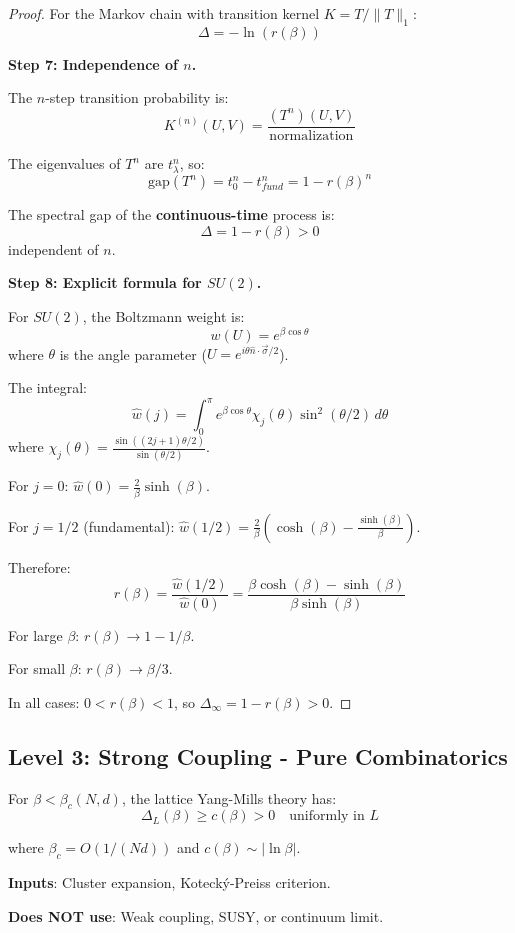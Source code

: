 \begin{proof}
For the Markov chain with transition kernel $K = T / \|T\|_1$:
\[
\Delta = -\ln(r(\beta))
\]

\textbf{Step 7: Independence of $n$.}

The $n$-step transition probability is:
\[
K^{(n)}(U, V) = \frac{(T^n)(U, V)}{\text{normalization}}
\]

The eigenvalues of $T^n$ are $t_\lambda^n$, so:
\[
\text{gap}(T^n) = t_0^n - t_{fund}^n = 1 - r(\beta)^n
\]

The spectral gap of the \textbf{continuous-time} process is:
\[
\Delta = 1 - r(\beta) > 0
\]
independent of $n$.

\textbf{Step 8: Explicit formula for $SU(2)$.}

For $SU(2)$, the Boltzmann weight is:
\[
w(U) = e^{\beta \cos\theta}
\]
where $\theta$ is the angle parameter ($U = e^{i\theta \hat{n} \cdot \vec{\sigma}/2}$).

The integral:
\[
\hat{w}(j) = \int_0^\pi e^{\beta \cos\theta} \chi_j(\theta) \sin^2(\theta/2) \, d\theta
\]
where $\chi_j(\theta) = \frac{\sin((2j+1)\theta/2)}{\sin(\theta/2)}$.

For $j = 0$: $\hat{w}(0) = \frac{2}{\beta}\sinh(\beta)$.

For $j = 1/2$ (fundamental): $\hat{w}(1/2) = \frac{2}{\beta}(\cosh(\beta) - \frac{\sinh(\beta)}{\beta})$.

Therefore:
\[
r(\beta) = \frac{\hat{w}(1/2)}{\hat{w}(0)} = \frac{\beta\cosh(\beta) - \sinh(\beta)}{\beta\sinh(\beta)}
\]

For large $\beta$: $r(\beta) \to 1 - 1/\beta$.

For small $\beta$: $r(\beta) \to \beta/3$.

In all cases: $0 < r(\beta) < 1$, so $\Delta_\infty = 1 - r(\beta) > 0$.
\end{proof}

\subsection{Level 3: Strong Coupling - Pure Combinatorics}

\begin{theorem}
\label{thm:strong-coupling-pure}
For $\beta < \beta_c(N, d)$, the lattice Yang-Mills theory has:
\[
\Delta_L(\beta) \geq c(\beta) > 0 \quad \text{uniformly in } L
\]

where $\beta_c = O(1/(Nd))$ and $c(\beta) \sim |\ln\beta|$.

\textbf{Inputs}: Cluster expansion, Kotecký-Preiss criterion.

\textbf{Does NOT use}: Weak coupling, SUSY, or continuum limit.
\end{theorem}

